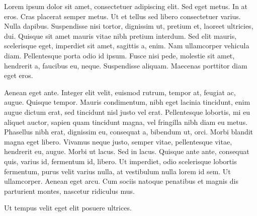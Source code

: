 \documentclass[a4paper,draft]{article}
\begin{document}
\nocite{test-booklet}
Lorem ipsum dolor sit amet, consectetuer adipiscing elit.
Sed eget metus. In at eros. Cras placerat semper metus.
Ut et tellus sed libero consectetuer varius. Nulla dapibus.
Suspendisse nisi tortor, dignissim ut, pretium et, laoreet
ultricies, dui. Quisque sit amet mauris vitae nibh pretium
interdum. Sed elit mauris, scelerisque eget, imperdiet sit
amet, sagittis a, enim. Nam ullamcorper vehicula diam.
Pellentesque porta odio id ipsum. Fusce nisi pede, molestie
sit amet, hendrerit a, faucibus eu, neque. Suspendisse
aliquam. \cite{viktorov-metodoj}
Maecenas porttitor diam eget eros. 

Aenean eget ante. Integer elit velit, euismod rutrum, tempor
at, feugiat ac, augue. Quisque tempor. Mauris condimentum,
nibh eget lacinia tincidunt, enim augue dictum erat, sed
tincidunt nisl justo vel erat. Pellentesque lobortis, mi eu
aliquet auctor, sapien quam tincidunt magna, vel fringilla
nibh diam eu metus. Phasellus nibh erat, dignissim eu,
consequat a, bibendum ut, orci. Morbi blandit magna eget
libero. \cite{ruckenstein-diffusion} Vivamus neque justo, semper vitae, pellentesque
vitae, hendrerit eu, augue. Morbi ut lacus. Sed in lacus.
Quisque ante ante, consequat quis, varius id, fermentum id,
libero. Ut imperdiet, odio scelerisque lobortis fermentum,
purus velit varius nulla, at vestibulum nulla lorem id sem.
Ut ullamcorper. Aenean eget arcu. Cum sociis natoque penatibus
et magnis dis parturient montes, nascetur ridiculus mus.

Ut tempus velit eget elit posuere ultrices. \cite{viktorov-metodoj}


\end{document}
